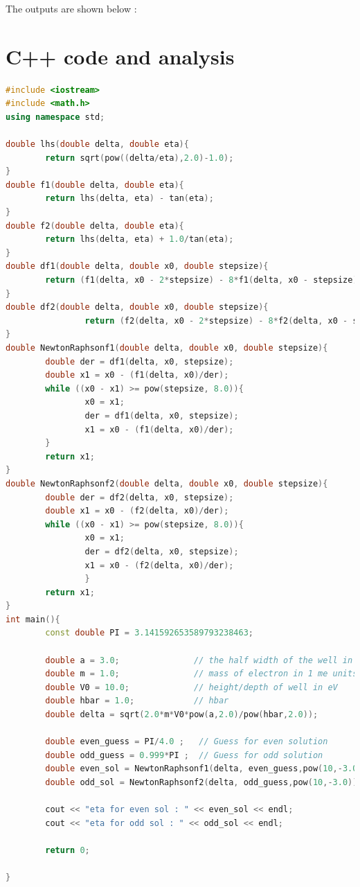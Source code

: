 \documentclass[a4paper,10pt]{article}
\begin{document}
The outputs are shown below :



\section*{C++ code and analysis}
\begin{lstlisting}[language=c++]
#include <iostream>
#include <math.h>
using namespace std;

double lhs(double delta, double eta){
        return sqrt(pow((delta/eta),2.0)-1.0);
}
double f1(double delta, double eta){
        return lhs(delta, eta) - tan(eta);
}
double f2(double delta, double eta){
        return lhs(delta, eta) + 1.0/tan(eta);
}
double df1(double delta, double x0, double stepsize){
        return (f1(delta, x0 - 2*stepsize) - 8*f1(delta, x0 - stepsize) + 8*f1(delta, x0 + stepsize) - f1(delta, x0 + 2*stepsize))/(12*stepsize) ;
}
double df2(double delta, double x0, double stepsize){
                return (f2(delta, x0 - 2*stepsize) - 8*f2(delta, x0 - stepsize) + 8*f2(delta, x0 + stepsize) - f2(delta, x0 + 2*stepsize))/(12*stepsize) ;
}
double NewtonRaphsonf1(double delta, double x0, double stepsize){
        double der = df1(delta, x0, stepsize);
        double x1 = x0 - (f1(delta, x0)/der);
        while ((x0 - x1) >= pow(stepsize, 8.0)){
                x0 = x1;
                der = df1(delta, x0, stepsize);
                x1 = x0 - (f1(delta, x0)/der);
        }
        return x1;
}
double NewtonRaphsonf2(double delta, double x0, double stepsize){
        double der = df2(delta, x0, stepsize);
        double x1 = x0 - (f2(delta, x0)/der);
        while ((x0 - x1) >= pow(stepsize, 8.0)){
                x0 = x1;
                der = df2(delta, x0, stepsize);
                x1 = x0 - (f2(delta, x0)/der);
                }
        return x1;
}
int main(){
        const double PI = 3.141592653589793238463;

        double a = 3.0;               // the half width of the well in angstroms 
        double m = 1.0;               // mass of electron in 1 me units
        double V0 = 10.0;             // height/depth of well in eV
        double hbar = 1.0;            // hbar
        double delta = sqrt(2.0*m*V0*pow(a,2.0)/pow(hbar,2.0));

        double even_guess = PI/4.0 ;   // Guess for even solution
        double odd_guess = 0.999*PI ;  // Guess for odd solution
        double even_sol = NewtonRaphsonf1(delta, even_guess,pow(10,-3.0)) ; // Obtaining the solution using the Newton Raphson method
        double odd_sol = NewtonRaphsonf2(delta, odd_guess,pow(10,-3.0)) ;  // Obtaining the solution using the Newton Raphson method

        cout << "eta for even sol : " << even_sol << endl;
        cout << "eta for odd sol : " << odd_sol << endl;

        return 0;

} 
\end{lstlisting}
\end{document}

